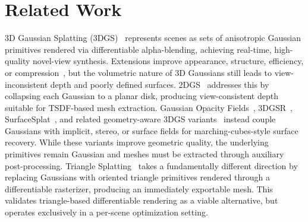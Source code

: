 \section{Related Work}

3D Gaussian Splatting (3DGS)~\citep{kerbl20233d} represents scenes as sets of anisotropic Gaussian primitives rendered via differentiable alpha-blending, achieving real-time, high-quality novel-view synthesis. Extensions improve appearance, structure, efficiency, or compression~\citep{zhang2024fregs,jiang2024gaussianshader,lu2024scaffold,peng2024bags,zhao2024bad,lee2024compact,chen2024hac,fan2024lightgaussian,niedermayr2024compressed}, but the volumetric nature of 3D Gaussians still leads to view-inconsistent depth and poorly defined surfaces. 2DGS~\citep{huang20242d} addresses this by collapsing each Gaussian to a planar disk, producing view-consistent depth suitable for TSDF-based mesh extraction. Gaussian Opacity Fields~\citep{yu2024gaussian}, 3DGSR~\citep{lyu20243dgsr}, SurfaceSplat~\citep{gao2025surfacesplat}, and related geometry-aware 3DGS variants~\citep{fan2024trim,wolf2024surface,cheng2024gaussianpro,ververas2024sags} instead couple Gaussians with implicit, stereo, or surface fields for marching-cubes-style surface recovery. While these variants improve geometric quality, the underlying primitives remain Gaussian and meshes must be extracted through auxiliary post-processing. Triangle Splatting~\citep{Held2025Triangle} takes a fundamentally different direction by replacing Gaussians with oriented triangle primitives rendered through a differentiable rasterizer, producing an immediately exportable mesh. This validates triangle-based differentiable rendering as a viable alternative, but operates exclusively in a per-scene optimization setting.

